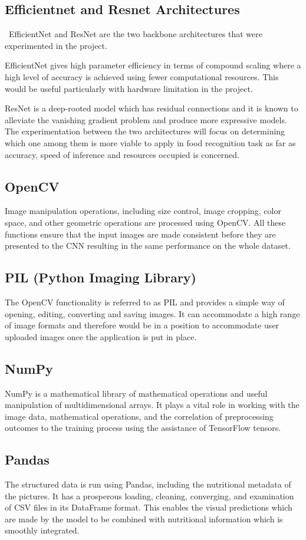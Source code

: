 \documentclass[12pt, openany]{report}
\begin{document}
\subsection{Efficientnet and Resnet Architectures}\
EfficientNet and ResNet are the two backbone architectures that were experimented in the project.

EfficientNet gives high parameter efficiency in terms of compound scaling where a high level of accuracy is achieved using fewer computational resources. This would be useful particularly with hardware limitation in the project.

ResNet is a deep-rooted model which has residual connections and it is known to alleviate the vanishing gradient problem and produce more expressive models.
The experimentation between the two architectures will focus on determining which one among them is more viable to apply in food recognition task as far as accuracy, speed of inference and resources occupied is concerned.
\subsection{OpenCV}
Image manipulation operations, including size control, image cropping, color space, and other geometric operations are processed using OpenCV. All these functions ensure that the input images are made consistent before they are presented to the CNN resulting in the same performance on the whole dataset.
\subsection{PIL (Python Imaging Library)}
The OpenCV functionality is referred to as PIL and provides a simple way of opening, editing, converting and saving images. It can accommodate a high range of image formats and therefore would be in a position to accommodate user uploaded images once the application is put in place.
\subsection{NumPy}
NumPy is a mathematical library of mathematical operations and useful manipulation of multidimensional arrays. It plays a vital role in working with the image data, mathematical operations, and the correlation of preprocessing outcomes to the training process using the assistance of TensorFlow tensors.
\subsection{ Pandas}
The structured data is run using Pandas, including the nutritional metadata of the pictures. It has a prosperous loading, cleaning, converging, and examination of CSV files in its DataFrame format. This enables the visual predictions which are made by the model to be combined with nutritional information which is smoothly integrated.
\end{document}
